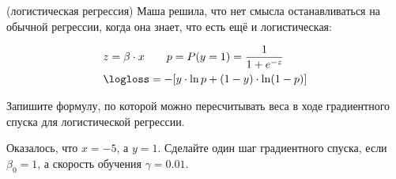 \begin{problem}{(логистическая регрессия)}
Маша решила, что нет смысла останавливаться на обычной регрессии, когда она знает, что есть ещё и логистическая:

\begin{equation*}
\begin{aligned}
& z  = \beta \cdot x \qquad p = P(y = 1) = \frac{1}{1 + e^{-z}} \\
& \logloss = -[ y \cdot \ln p + (1 - y) \cdot \ln (1 - p) ]
\end{aligned}
\end{equation*}

Запишите формулу, по которой можно пересчитывать веса в ходе градиентного спуска для логистической регрессии. 

Оказалось, что $x = -5$, а $y = 1$. Сделайте один шаг градиентного спуска, если $\beta_0 = 1$, а скорость обучения $\gamma = 0.01$. 
\end{problem}

